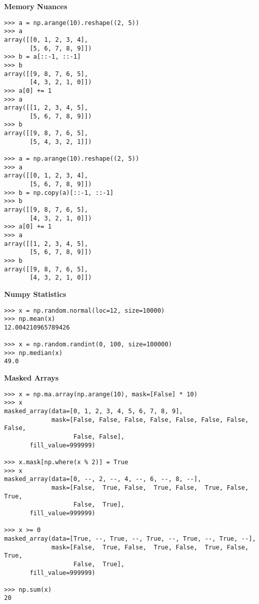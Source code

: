 \documentclass[oneside]{scrbook}
\begin{document}
\noindent
\textbf{Memory Nuances}
\begin{verbatim}
>>> a = np.arange(10).reshape((2, 5))
>>> a
array([[0, 1, 2, 3, 4],
       [5, 6, 7, 8, 9]])
>>> b = a[::-1, ::-1]
>>> b
array([[9, 8, 7, 6, 5],
       [4, 3, 2, 1, 0]])
>>> a[0] += 1
>>> a
array([[1, 2, 3, 4, 5],
       [5, 6, 7, 8, 9]])
>>> b
array([[9, 8, 7, 6, 5],
       [5, 4, 3, 2, 1]])

>>> a = np.arange(10).reshape((2, 5))
>>> a
array([[0, 1, 2, 3, 4],
       [5, 6, 7, 8, 9]])
>>> b = np.copy(a)[::-1, ::-1]
>>> b
array([[9, 8, 7, 6, 5],
       [4, 3, 2, 1, 0]])
>>> a[0] += 1
>>> a
array([[1, 2, 3, 4, 5],
       [5, 6, 7, 8, 9]])
>>> b
array([[9, 8, 7, 6, 5],
       [4, 3, 2, 1, 0]])

\end{verbatim}

\noindent
\textbf{Numpy Statistics}
\begin{verbatim}
>>> x = np.random.normal(loc=12, size=10000)
>>> np.mean(x)
12.004210965789426

>>> x = np.random.randint(0, 100, size=100000)
>>> np.median(x)
49.0

\end{verbatim}

\noindent
\textbf{Masked Arrays}
\begin{verbatim}
>>> x = np.ma.array(np.arange(10), mask=[False] * 10)
>>> x
masked_array(data=[0, 1, 2, 3, 4, 5, 6, 7, 8, 9],
             mask=[False, False, False, False, False, False, False, False,
                   False, False],
       fill_value=999999)

>>> x.mask[np.where(x % 2)] = True
>>> x
masked_array(data=[0, --, 2, --, 4, --, 6, --, 8, --],
             mask=[False,  True, False,  True, False,  True, False,  True,
                   False,  True],
       fill_value=999999)

>>> x >= 0
masked_array(data=[True, --, True, --, True, --, True, --, True, --],
             mask=[False,  True, False,  True, False,  True, False,  True,
                   False,  True],
       fill_value=999999)

>>> np.sum(x)
20

\end{verbatim}
\end{document}
